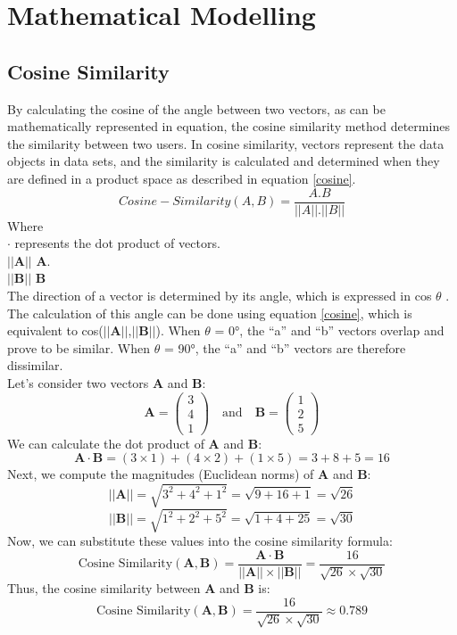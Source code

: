 \section{Mathematical Modelling}

\subsection{Cosine Similarity}
By calculating the cosine of the angle between two vectors, as can be mathematically represented in equation, the cosine similarity method determines the similarity between two users. In cosine similarity, vectors represent the data objects in data sets, and the similarity is calculated and determined when they are defined in a product space as described in equation \ref{cosine}. 
\begin{equation}
\label{cosine}
Cosine-Similarity(A, B) = \frac{A.B}{||A||.||B||}
\end{equation}
Where\\
$\cdot$  represents the dot product of vectors. \\
$||\mathbf{A}||$   $\mathbf{A}$. \\
$||\mathbf{B}|| $  $\mathbf{B}$\\
The direction of a vector is determined by its angle, which is expressed in cos $\theta$ . The calculation of this angle  can be done using equation \ref{cosine}, which is equivalent to cos($||\mathbf{A}||$,$||\mathbf{B}||$). When $\theta$ = 0°, the “a” and “b” vectors overlap and prove to be similar. When $\theta$ = 90°, the “a” and “b” vectors are therefore dissimilar. \\ 
Let's consider two vectors \( \mathbf{A} \) and \( \mathbf{B} \):
\[ \mathbf{A} = \begin{pmatrix} 3 \\ 4 \\ 1 \end{pmatrix} \quad \text{and} \quad \mathbf{B} = \begin{pmatrix} 1 \\ 2 \\ 5 \end{pmatrix} \]
We can calculate the dot product of \( \mathbf{A} \) and \( \mathbf{B} \):
\[ \mathbf{A} \cdot \mathbf{B} = (3 \times 1) + (4 \times 2) + (1 \times 5) = 3 + 8 + 5 = 16 \]
Next, we compute the magnitudes (Euclidean norms) of \( \mathbf{A} \) and \( \mathbf{B} \):
\[ ||\mathbf{A}|| = \sqrt{3^2 + 4^2 + 1^2} = \sqrt{9 + 16 + 1} = \sqrt{26} \]
\[ ||\mathbf{B}|| = \sqrt{1^2 + 2^2 + 5^2} = \sqrt{1 + 4 + 25} = \sqrt{30} \]
Now, we can substitute these values into the cosine similarity formula:
\[ \text{Cosine Similarity}(\mathbf{A}, \mathbf{B}) = \frac{\mathbf{A} \cdot \mathbf{B}}{||\mathbf{A}|| \times ||\mathbf{B}||} = \frac{16}{\sqrt{26} \times \sqrt{30}} \]
Thus, the cosine similarity between \( \mathbf{A} \) and \( \mathbf{B} \) is:
\[ \text{Cosine Similarity}(\mathbf{A}, \mathbf{B}) = \frac{16}{\sqrt{26} \times \sqrt{30}} \approx 0.789 \]


